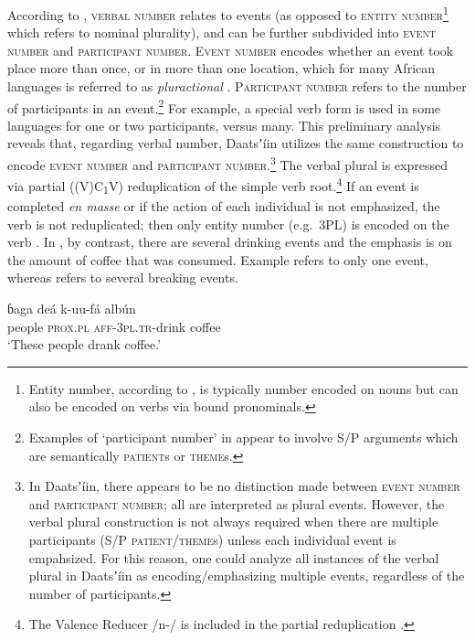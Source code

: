 \documentclass[output=paper]{langsci/langscibook}
\begin{document}
According to \citet[246-249]{Corbett2000}, \textsc{verbal number} relates to events (as opposed to \textsc{entity number}\footnote{Entity number, according to \citet{Corbett2000}, is typically number encoded on nouns but can also be encoded on verbs via bound pronominals.} which refers to nominal plurality), and can be further subdivided into \textsc{event number} and \textsc{participant number}. \textsc{Event number} encodes whether an event took place more than once, or in more than one location, which for many African languages is referred to as \textit{pluractional} \citep[243]{Corbett2000}. \textsc{Participant number} refers to the number of participants in an event.\footnote{Examples of ‘participant number’ in \citet[247-8]{Corbett2000} appear to involve S/P arguments which are semantically \textsc{patient}s or \textsc{theme}s.} For example, a special verb form is used in some languages for one or two participants, versus many. This preliminary analysis reveals that, regarding verbal number, Daatsʼíin utilizes the same construction to encode \textsc{event number} and \textsc{participant number}.\footnote{In Daatsʼíin, there appears to be no distinction made between \textsc{event number }and \textsc{participant number}; all are interpreted as plural events. However, the verbal plural construction is not always required when there are multiple participants (S/P \textsc{patient}/\textsc{theme}s) unless each individual event is empahsized. For this reason, one could analyze all instances of the verbal plural in Daatsʼíin as encoding/emphasizing multiple events, regardless of the number of participants.} The verbal plural is expressed via partial ((V)C\textsubscript{1}V) reduplication of the simple verb root.\footnote{The Valence Reducer /n-/ is included in the partial reduplication .} If an event is completed \textit{en masse} or if the action of each individual is not emphasized, the verb is not reduplicated; then only entity number (e.g.\ 3PL) is encoded on the verb . In , by contrast, there are several drinking events and the emphasis is on the amount of coffee that was consumed. Example  refers to only one event, whereas  refers to several breaking events. 

\ea\label{ex:ahlandc:36}
\gll
ɓaga  deá  k-uu-fá                   alb\'{u}n \\
people \textsc{prox.pl}  \textsc{aff-3pl.tr}{}-drink   coffee \\
\glt
‘These people drank coffee.’
\z
\end{document}
